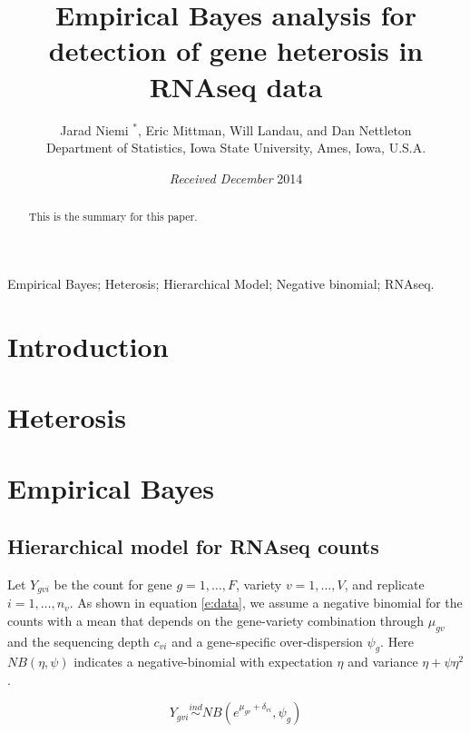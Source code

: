 \documentclass[useAMS,usenatbib,referee]{biom}
\title[eBayes for heterosis in RNAseq]{Empirical Bayes analysis for detection of gene heterosis in RNAseq data}
\author{Jarad Niemi $^*$\email{niemi@iastate.edu}, 
Eric Mittman, 
Will Landau, and 
Dan Nettleton \\
Department of Statistics, Iowa State University, Ames, Iowa, U.S.A.}
\begin{document}
\date{{\it Received December} 2014} 

\pagerange{\pageref{firstpage}--\pageref{lastpage}} 

\label{firstpage}


\begin{abstract}
This is the summary for this paper.
\end{abstract}

\begin{keywords}
Empirical Bayes; Heterosis; Hierarchical Model; Negative binomial; RNAseq.
\end{keywords}

\maketitle


\section{Introduction}
\label{s:intro}

\section{Heterosis}
\label{s:heterosis}

\section{Empirical Bayes}
\subsection{Hierarchical model for RNAseq counts}
\label{s:model}

Let $Y_{gvi}$ be the count for gene $g=1,\ldots,F$, variety $v=1,\ldots,V$, and replicate $i=1,\ldots,n_v$. As shown in equation \eqref{e:data}, we assume a negative binomial for the counts with a mean that depends on the gene-variety combination through $\mu_{gv}$ and the sequencing depth $c_{vi}$ and a gene-specific over-dispersion $\psi_g$. Here $NB(\eta,\psi)$ indicates a negative-binomial with expectation $\eta$ and variance $\eta+\psi\eta^2$. 

\begin{equation} 
Y_{gvi} \stackrel{ind}{\sim} NB(e^{\mu_{gv}+\delta_{vi}},\psi_g) 
\label{e:data}
\end{equation}
\end{document}
